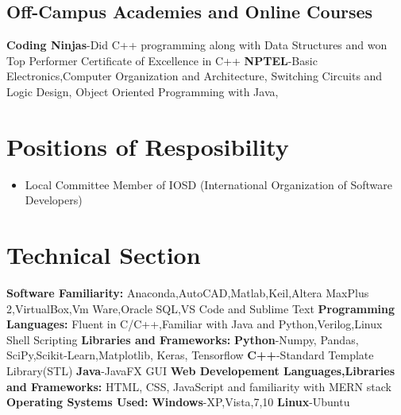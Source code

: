 \documentclass[a4paper,12pt]{article}
\begin{document}
    \subsection*{Off-Campus Academies and Online Courses}
    \textbf{Coding Ninjas}-Did C++ programming along with Data Structures 
    and won Top Performer Certificate of Excellence in C++
    \newline
    \textbf{NPTEL}-Basic Electronics,Computer Organization and Architecture, 
    Switching Circuits and Logic Design, Object Oriented Programming with Java,
    
\section*{Positions of Resposibility}
    \begin{itemize}
        \item Local Committee Member of IOSD
        (International Organization of Software Developers)
    \end{itemize}


\section*{Technical Section}
\textbf{Software Familiarity: }
\newline
Anaconda,AutoCAD,Matlab,Keil,Altera MaxPlus 2,VirtualBox,Vm Ware,Oracle SQL,VS Code and Sublime Text 
\newline
\textbf{Programming Languages: }
\newline
Fluent in C/C++,Familiar with Java and Python,Verilog,Linux Shell Scripting
\newline
\textbf{Libraries and Frameworks: }
\newline
\textbf{Python}-Numpy, Pandas, SciPy,Scikit-Learn,Matplotlib, Keras, Tensorflow    
\newline
\textbf{C++}-Standard Template Library(STL)    
\newline
\textbf{Java}-JavaFX GUI    
\newline
\textbf{Web Developement Languages,Libraries and Frameworks: }
\newline
HTML, CSS, JavaScript and familiarity with MERN stack 
\newline
\textbf{Operating Systems Used: }
\newline
\textbf{Windows}-XP,Vista,7,10
\newline 
\textbf{Linux}-Ubuntu
\end{document}
